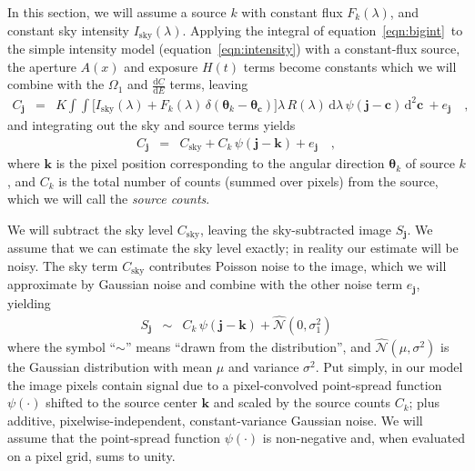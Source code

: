 \documentclass[letterpaper,preprint]{aastex}
\newcommand{\equationname}{equation}
\newcommand{\eqnref}[1]{\mbox{\equationname~\ref{#1}}}
\newcommand{\fig}{Figure}
\newcommand{\figref}[1]{\mbox{\fig~\ref{#1}}}
\newcommand{\drawnfrom}{\sim}
\newcommand{\gaussianN}{\mathcal{N}}
\newcommand{\gaussx}[1]{\hat{\gaussianN}\!\left(#1\right)}
\newcommand{\sky}{\mathrm{sky}}
\newcommand{\dd}{\mathrm{d}}
\newcommand{\noise}{e}
\renewcommand{\vec}[1]{\boldsymbol{#1}}
\newcommand{\thetavec}{\vec{\theta}}
\newcommand{\jvec}{\vec{j}}
\newcommand{\kvec}{\vec{k}}
\newcommand{\cvec}{\vec{c}}
\begin{document}
In this section, we will assume a source $k$ with constant flux
$F_k(\lambda)$, and constant sky intensity $I_{\sky}(\lambda)$.
Applying the integral of \eqnref{eqn:bigint}\ to the simple intensity
model (\eqnref{eqn:intensity}) with a constant-flux source, the
aperture $A(x)$ and exposure $H(t)$
terms become constants which we will combine with the $\Omega_1$ and
$\frac{\dd C}{\dd E}$ terms, leaving
\begin{eqnarray}\displaystyle
C_{\jvec} &=& K
\int \!\!
\int
\Big[
  I_{\sky}(\lambda) + F_k(\lambda)\,\delta(\thetavec_k - \thetavec_{\cvec})
\Big]
\lambda\,R(\lambda)\,
\dd\lambda\,
\psi(\jvec - \cvec)\,
\dd^2 \cvec\
  + \noise_{\jvec} \quad ,
\end{eqnarray}
and integrating out the sky and source terms yields
\begin{eqnarray}\displaystyle
  C_{\jvec} &=& C_{\sky} + C_k \, \psi(\jvec - \kvec)  + \noise_{\jvec} \quad ,
\end{eqnarray}
where $\kvec$ is the pixel position corresponding to the angular
direction $\thetavec_k$ of source $k$, and $C_k$ is the total number
of counts (summed over pixels) from the source, which we will call the
\emph{source counts}.


We will subtract the sky level $C_{\sky}$, leaving the sky-subtracted
image $S_{\jvec}$.  We assume that we can estimate the sky level
exactly; in reality our estimate will be noisy.  The sky term
$C_{\sky}$ contributes Poisson noise to the image, which we will
approximate by Gaussian noise and combine with the other noise term
$\noise_{\jvec}$, yielding
\begin{eqnarray}\displaystyle
  S_{\jvec} &\drawnfrom& C_k \, \psi(\jvec - \kvec) + \gaussx{0,\sigma_1^2}
\label{eq:modelimg}
\end{eqnarray}
where the symbol ``$\drawnfrom$'' means ``drawn from the
distribution'', and $\gaussx{\mu,\sigma^2}$ is the Gaussian
distribution with mean $\mu$ and variance $\sigma^2$.  Put simply, in
our model the image pixels contain signal due to a pixel-convolved
point-spread function $\psi(\cdot)$ shifted to the source center
$\kvec$ and scaled by the source counts $C_k$; plus additive,
pixelwise-independent, constant-variance Gaussian noise.  We will
assume that the point-spread function $\psi(\cdot)$ is non-negative
and, when evaluated on a pixel grid, sums to unity.
\end{document}
